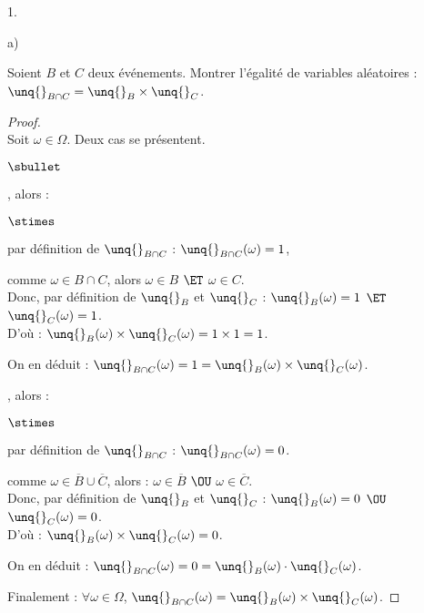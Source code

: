 \begin{noliste}{1.}
\begin{noliste}{a)}
    
    \item Soient $B$ et $C$ deux événements. Montrer l'égalité de 
    variables aléatoires : $\unq{}_{B \cap C} = \unq{}_B \times 
    \unq{}_C$.
    
    \begin{proof}~\\
    Soit $\omega \in \Omega$. Deux cas se présentent.
      \begin{noliste}{$\sbullet$}
	\item {}, alors :
	\begin{noliste}{$\stimes$}
	  \item par définition de $\unq{}_{B\cap C}$ : 
	  $\unq{}_{B \cap C}(\omega)=1$,
	  
	  \item comme $\omega \in B \cap C$, alors $\omega \in B$
	  $\ET$ $\omega \in C$.\\
	  Donc, par définition de $\unq{}_B$ et $\unq{}_C$ : 
	  $\unq{}_B(\omega) =1 $ $\ET$ $\unq{}_C(\omega)=1$.\\
	  D'où : $\unq{}_B(\omega) \times \unq{}_C(\omega) = 1 \times
	  1 = 1$.
	\end{noliste}
	On en déduit : $\unq{}_{B \cap C}(\omega) = 1 = 
	\unq{}_B(\omega) \times \unq{}_C(\omega)$.
	
	\item {}, alors :
	\begin{noliste}{$\stimes$}
	  \item par définition de $\unq{}_{B \cap C}$ : 
	  $\unq{}_{B \cap C}(\omega)=0$.
	  
	  \item comme $\omega \in \overline{B} \cup \overline{C}$, 
	  alors :
	  $\omega \in \overline{B}$ $\OU$ $\omega \in \overline{C}$.\\
	  Donc, par définition de $\unq{}_B$ et $\unq{}_C$ : 
	  $\unq{}_B(\omega) =0$ $\OU$ $\unq{}_C(\omega)=0$.\\
	  D'où : $\unq{}_B(\omega) \times \unq{}_C(\omega) =0$.
	\end{noliste}
	On en déduit : $\unq{}_{B\cap C}(\omega) = 0 = \unq{}_B
	(\omega) \cdot \unq{}_C(\omega)$.
      \end{noliste}
      Finalement : $\forall \omega \in \Omega$, $\unq{}_{B\cap C} 
      (\omega) = \unq{}_B(\omega) \times \unq{}_C(\omega)$.
      

\end{proof}
\end{noliste}
\end{noliste}
